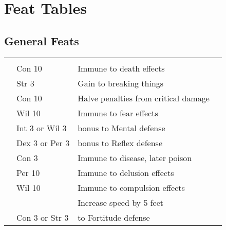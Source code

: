 \section{Feat Tables}
\onecolumn

\subsection{General Feats}
\begin{longtabuwrapper}
    \begin{longtabu}{>{\lcol}p{10em} >{\lcol}p{15em} >{\lcol}X >{\lcol}p{3em}}
         &  &  &  \\
         & Con 10 & Immune to death effects &  \\
         & Str 3 & Gain  to breaking things &  \\
         & Con 10 & Halve penalties from critical damage &  \\
         & Wil 10 & Immune to fear effects &  \\
         & Int 3 or Wil 3 &  bonus to Mental defense &  \\
         & Dex 3 or Per 3 &   bonus to Reflex defense &  \\
         & Con 3 & Immune to disease, later poison &  \\
         & Per 10 & Immune to delusion effects &  \\
         & Wil 10 & Immune to compulsion effects &  \\
         & \x & Increase speed by 5 feet &  \\
         & Con 3 or Str 3 &  to Fortitude defense &  \\


\end{longtabu}
\end{longtabuwrapper}
